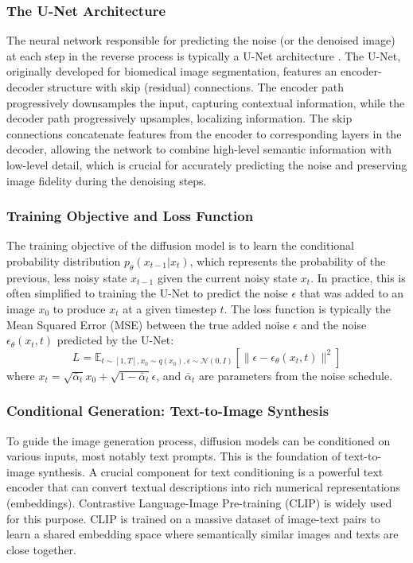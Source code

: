 \subsubsection{The U-Net Architecture}
The neural network responsible for predicting the noise (or the denoised image) at each step in the reverse process is typically a U-Net architecture \cite{unet}. The U-Net, originally developed for biomedical image segmentation, features an encoder-decoder structure with skip (residual) connections. The encoder path progressively downsamples the input, capturing contextual information, while the decoder path progressively upsamples, localizing information. The skip connections concatenate features from the encoder to corresponding layers in the decoder, allowing the network to combine high-level semantic information with low-level detail, which is crucial for accurately predicting the noise and preserving image fidelity during the denoising steps.

\subsubsection{Training Objective and Loss Function}
The training objective of the diffusion model is to learn the conditional probability distribution $p_\theta(x_{t-1}|x_t)$, which represents the probability of the previous, less noisy state $x_{t-1}$ given the current noisy state $x_t$. In practice, this is often simplified to training the U-Net to predict the noise $\epsilon$ that was added to an image $x_0$ to produce $x_t$ at a given timestep $t$. The loss function is typically the Mean Squared Error (MSE) between the true added noise $\epsilon$ and the noise $\epsilon_\theta(x_t, t)$ predicted by the U-Net:
\[ L = \mathbb{E}_{t \sim [1, T], x_0 \sim q(x_0), \epsilon \sim \mathcal{N}(0, I)} [\|\epsilon - \epsilon_\theta(x_t, t)\|^2] \]
where $x_t = \sqrt{\bar{\alpha}_t}x_0 + \sqrt{1-\bar{\alpha}_t}\epsilon$, and $\bar{\alpha}_t$ are parameters from the noise schedule.

\subsubsection{Conditional Generation: Text-to-Image Synthesis}
To guide the image generation process, diffusion models can be conditioned on various inputs, most notably text prompts. This is the foundation of text-to-image synthesis.
A crucial component for text conditioning is a powerful text encoder that can convert textual descriptions into rich numerical representations (embeddings). Contrastive Language-Image Pre-training (CLIP) \cite{clip} is widely used for this purpose. CLIP is trained on a massive dataset of image-text pairs to learn a shared embedding space where semantically similar images and texts are close together.

